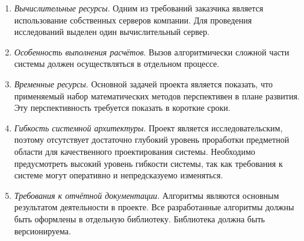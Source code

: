 \begin{enumerate}
    \item {
        \textit{Вычислительные ресурсы}.
        Одним из требований заказчика является использование собственных серверов компании.
        Для проведения исследований выделен один вычислительный сервер.
    }
    \item {
        \textit{Особенность выполнения расчётов}.
        Вызов алгоритмически сложной части системы должен осуществляться в отдельном процессе.
    }
    \item {
        \textit{Временные ресурсы}.
        Основной задачей проекта является показать, что применяемый набор математических
        методов перспективен в плане развития. Эту перспективность требуется показать в короткие сроки.
    }
    \item {
        \textit{Гибкость системной архитектуры}.
        Проект является исследовательским, поэтому
        отсутствует достаточно глубокий уровень проработки предметной области для качественного проектирования системы.
        Необходимо предусмотреть высокий уровень гибкости системы,
        так как требования к системе могут оперативно и непредсказуемо изменяться.
    }
    \item {
        \textit{Требования к отчётной документации}.
        Алгоритмы являются основным результатом деятельности в проекте.
        Все разработанные алгоритмы должны быть оформлены в отдельную библиотеку.
        Библиотека должна быть версионируема.
    }
\end{enumerate}